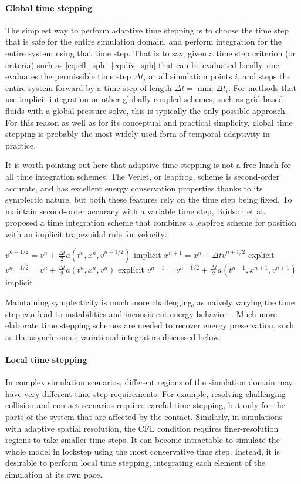 \paragraph*{Global time stepping}

The simplest way to perform adaptive time stepping is to choose the time step that is safe for the entire simulation domain, and perform integration for the entire system using that time step.
That is to say, given a time step criterion (or criteria) such as \eqref{eq:cfl_sph}--\eqref{eq:div_sph} that can be evaluated locally, one evaluates the permissible time step $\Delta t_i$ at all simulation points $i$, and steps the entire system forward by a time step of length $\Delta t = \min_i \Delta t_i$.
For methods that use implicit integration or other globally coupled schemes, such as grid-based fluids with a global pressure solve, this is typically the only possible approach.
For this reason as well as for its conceptual and practical simplicity, global time stepping is probably the most widely used form of temporal adaptivity in practice.

It is worth pointing out here that adaptive time stepping is not a free lunch for all time integration schemes.
The Verlet, or leapfrog, scheme is second-order accurate, and has excellent energy conservation properties thanks to its symplectic nature, but both these features rely on the time step being fixed.
To maintain second-order accuracy with a variable time step, Bridson et al.~\cite{Bridson2003} proposed a time integration scheme that combines a leapfrog scheme for position with an implicit trapezoidal rule for velocity:
\smallskip
\begin{algorithmic}[1]
\State $\tilde v^{n+1/2} = v^n + \frac{\Delta t}2 a(t^n, x^n, \tilde v^{n+1/2})$ \Comment implicit
\State $x^{n+1} = x^n + \Delta t\tilde v^{n+1/2}$ \Comment explicit
\State $v^{n+1/2} = v^n + \frac{\Delta t}2 a(t^n, x^n, v^n)$ \Comment explicit
\State $v^{n+1} = v^{n+1/2} + \frac{\Delta t}2 a(t^{n+1}, x^{n+1}, v^{n+1})$ \Comment implicit
\end{algorithmic}
Maintaining symplecticity is much more challenging, as naively varying the time step can lead to instabilities and inconsistent energy behavior~\cite{Harmon2009}.
Much more elaborate time stepping schemes are needed to recover energy preservation, such as the asynchronous variational integrators discussed below.

\paragraph*{Local time stepping}
In complex simulation scenarios, different regions of the simulation domain may have very different time step requirements.
For example, resolving challenging collision and contact scenarios requires careful time stepping, but only for the parts of the system that are affected by the contact.
Similarly, in simulations with adaptive spatial resolution, the CFL condition requires finer-resolution regions to take smaller time steps.
It can become intractable to simulate the whole model in lockstep using the most conservative time step.
Instead, it is desirable to perform local time stepping, integrating each element of the simulation at its own pace.

